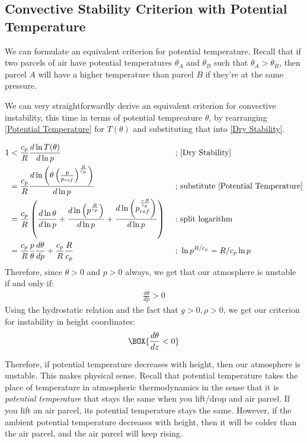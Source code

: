 \subsection{Convective Stability Criterion with Potential Temperature}

We can formulate an equivalent criterion for potential temperature. Recall that if two parcels of air have potential temperatures $\theta_A$ and $\theta_B$ such that $\theta_A>\theta_B$, then parcel $A$ will have a higher temperature than parcel $B$ if they're at the same pressure.

We can very straightforwardly derive an equivalent criterion for convective instability, this time in terms of potential tempreature $\theta$, by rearranging \ref{Potential Temperature} for $T(\theta)$ and substituting that into \ref{Dry Stability}.

\begin{align*}
    1&<\frac{c_p}{R}\frac{d\ln T(\theta)}{d\ln p}
    &\text{ ; }&\text{\ref{Dry Stability}}
    \\
    &=\frac{c_p}{R}\frac{d\ln \left( \theta\left( \frac{p}{p_{ref}} \right)^{\frac{R}{c_p}} \right)}{d\ln p}
    &\text{ ; }&\text{substitute \ref{Potential Temperature}}
    \\
    &=\frac{c_p}{R} \left( 
        \frac{d \ln \theta}{d \ln p}+
        \frac{d \ln \left(p^{\frac{R}{c_p}} \right)}{d \ln p}+
        \frac{d \ln \left(p_{ref}^{\frac{-R}{c_p}} \right)}{d \ln p}
     \right)
    &\text{ ; }&\text{split logarithm}
    \\
    &=\frac{c_p}{R}\frac{p}{\theta}\frac{d\theta}{dp}+\frac{c_p}{R}\frac{R}{c_p}
    &\text{ ; }
    &\ln p^{R/c_p}=R/c_p\ln p
\end{align*}
Therefore, since $\theta>0$ and $p>0$ always, we get that our atmosphere is unstable if and only if:
\begin{align}\label{Dry Stability Potential Temperature}
    \boxed{\frac{d\theta}{dp}>0}
\end{align}
Using the hydrostatic relation and the fact that $g>0,\rho>0$, we get our criterion for instability in height coordinates:
\begin{align}
    \BOX{\frac{d\theta}{dz}<0}
\end{align}

Therefore, if potential temperature decreases with height, then our atmosphere is unstable. This makes physical sense. Recall that potential temperature takes the place of temperature in atmospheric thermodynamics in the sense that it is \textit{potential temperature} that stays the same when you lift/drop and air parcel. If you lift an air parcel, its potential temperature stays the same. However, if the ambient potential temperature decreases with height, then it will be colder than the air parcel, and the air parcel will keep rising.

